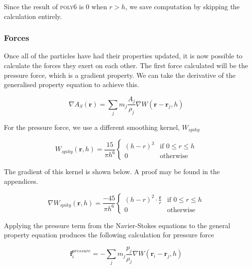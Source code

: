 \documentclass[12pt]{article}
\begin{document}
    Since the result of \textsc{poly6} is 0 when $r > h$, we save computation by skipping the calculation entirely.

    \subsubsection{Forces}

    Once all of the particles have had their properties updated, it is now possible to calculate the forces they exert on each other. The first force calculated will be the pressure force, which is a gradient property. We can take the derivative of the generalised property equation to achieve this.

    \begin{equation}
        \nabla A_S(\textbf{r}) = \sum_{j}{m_j \frac{A_j}{\rho_j}\nabla{W(\textbf{r} - \textbf{r}_j, h)}}
    \end{equation}

    For the pressure force, we use a different smoothing kernel, $W_{spiky}$

    \begin{equation}
        W_{spiky}(\textbf{r}, h) = \frac{15}{\pi{h}^6}
        \begin{cases}
            (h-r)^3 & \text{if } 0 \leq r \leq h \\
            0 & \text{otherwise}
        \end{cases} 
    \end{equation}

    The gradient of this kernel is shown below\cite{spikygrad}. A proof may be found in the appendices.

    \begin{equation}
        \nabla W_{spiky}(\textbf{r}, h) = \frac{-45}{\pi{h}^6}
        \begin{cases}
            (h-r)^2 \cdot \frac{\textbf{r}}{r} & \text{if } 0 \leq r \leq h \\
            0 & \text{otherwise}
        \end{cases}
    \end{equation}

    Applying the pressure term from the Navier-Stokes equations to the general property equation produces the following calculation for pressure force

    \begin{equation}
        \textbf{f}^{pressure}_i = -\sum_{j}{m_j}\frac{p_j}{\rho_j}\nabla{W(\textbf{r}_i - \textbf{r}_j, h)}
    \end{equation}
\end{document}
